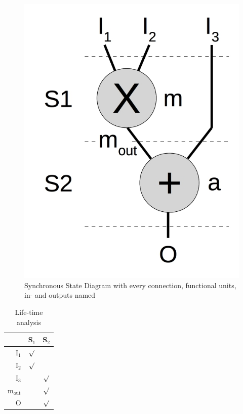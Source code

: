 \begin{figure}[ht!]
  \centering
  \includegraphics[scale=0.225]{figures/b_FSMD_SSD_extended}
  \caption{Synchronous State Diagram with every connection, functional units, in- and outputs named}
  \label{fig:b_FSMD_SSD_ext}
\end{figure}


\begin{table}[ht!]
  \centering
  \begin{tabular}{r | c | c}
  \toprule
  & S$_1$ & S$_2$\\
  \midrule
  I$_1$ & $\surd$ & \\
  I$_2$ & $\surd$ & \\
  I$_3$ & & $\surd$ \\
  m$_{\text{out}}$ & & $\surd$ \\
  O & & $\surd$
  \end{tabular}
  \caption{Life-time analysis}
  \label{tab:b_FSMD_lifetime_anal}
\end{table}


